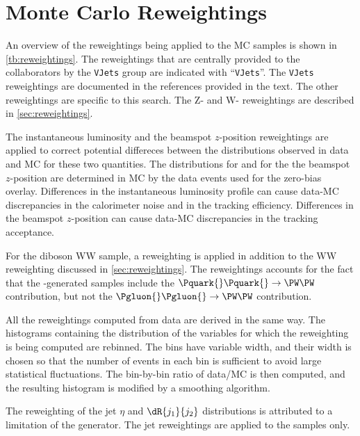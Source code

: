 \chapter{Monte Carlo Reweightings}
\label{app:reweightings}

An overview of the reweightings being applied to the MC samples is
shown in \cref{tb:reweightings}. The reweightings that are centrally
provided to the \dzero{} collaborators by the \verb=VJets= group are
indicated with ``\verb=VJets=''. The \verb=VJets= reweightings are
documented in the references provided in the text.
The other reweightings are specific to this search.
The Z-\pt{} and W-\pt{} reweightings are described in
\cref{sec:reweightings}.

The instantaneous luminosity \instLumi{} and the beamspot $z$-position
reweightings are applied to correct potential differeces between the
distributions observed in data and MC for these two quantities. The
distributions for \instLumi{} and for the the beamspot $z$-position
are determined in MC by the data events used for the zero-bias
overlay. Differences in the instantaneous luminosity profile can cause
data-MC discrepancies in the calorimeter noise and in the tracking
efficiency. Differences in the beamspot $z$-position can cause data-MC
discrepancies in the tracking acceptance.

For the diboson WW sample, a \dphi{\ell}{\ell} reweighting is applied
in addition to the WW \pt{} reweighting discussed in
\cref{sec:reweightings}. The \dphi{\ell}{\ell} reweightings accounts
for the fact that the \pythia{}-generated samples include the
$\Pquark{}\Pquark{}\to\PW\PW$ contribution, but not the
$\Pgluon{}\Pgluon{}\to\PW\PW$ contribution.

All the reweightings computed from data are derived in the same way.
The histograms containing the distribution of the variables for which
the reweighting is being computed are rebinned. The bins have variable
width, and their width is chosen so that the number of events in each
bin is sufficient to avoid large statistical fluctuations. The
bin-by-bin ratio of data/MC is then computed, and the resulting
histogram is modified by a smoothing algorithm.

The reweighting of the jet $\eta$ and $\dR{j_1}{j_2}$ distributions is
attributed to a limitation of the \alpgen{} generator. The jet
reweightings are applied to the \zGam{} samples only.


